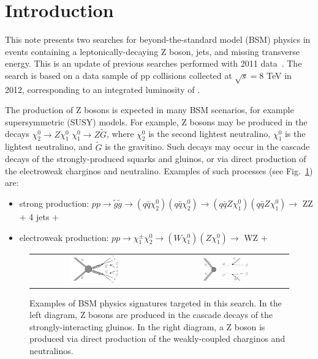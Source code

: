 \section{Introduction}
\label{ref:intro}

This note presents two searches for beyond-the-standard model (BSM) physics in events
containing a leptonically-decaying Z boson, jets, and missing transverse energy. This
is an update of previous searches performed with 2011 data~\cite{ref:Zpaper,ref:EWKPAS}.
The search is based on a data sample of pp collisions collected at $\sqrt{s}=8$ TeV in 2012,
corresponding to an integrated luminosity of \lumi.

The production of Z bosons is expected in many BSM scenarios, for example supersymmetric (SUSY)
models. For example, Z bosons may be produced in the decays $\chi^0_2\to Z \chi^0_1$ 
$\chi^0_1\to Z \tilde{G}$, where $\chi^0_2$ is the second lightest neutralino, $\chi^0_1$ is
the lightest neutralino, and $\tilde{G}$ is the gravitino. Such decays may occur in the cascade
decays of the strongly-produced squarks and gluinos, or via direct production of the electroweak
charginos and neutralino. Examples of such processes (see Fig.~\ref{fig:diagrams}) are:

\begin{itemize}
\item strong production:      $pp\to\tilde{g}\tilde{g}\to (q\bar{q}\chi^0_2) (q\bar{q}\chi^0_2)\to(q\bar{q}Z\chi^0_1) (q\bar{q}Z\chi^0_1)\to$ ZZ + 4 jets + \MET
\item electroweak production: $pp\to\chi^\pm_1\chi^0_2\to (W \chi^0_1)(Z \chi^0_1) \to$ WZ + \MET
\end{itemize}

\begin{figure}[!h]
\begin{center}
\begin{tabular}{cc}
\includegraphics[width=0.4\textwidth]{plots/T5zz.pdf} &
\includegraphics[width=0.4\textwidth]{plots/TChiwz.pdf} \\
\end{tabular}
\caption{
Examples of BSM physics signatures targeted in this search. In the left diagram, Z bosons are produced
in the cascade decays of the strongly-interacting gluinos. In the right diagram, a Z boson is produced
via direct production of the weakly-coupled charginos and neutralinos.
\label{fig:diagrams}
}
\end{center}
\end{figure}

